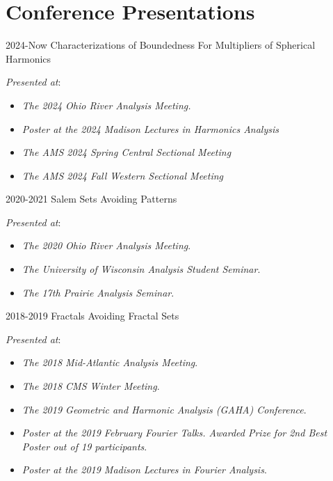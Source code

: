 \documentclass[a4paper]{cv-friggeri}
\begin{document}
\section{Conference Presentations}

\begin{entrylist}

\entry
{2024-Now}
{Characterizations of Boundedness For Multipliers of Spherical Harmonics}
{}
{\emph{Presented at}:
%
\begin{itemize}
	\item \emph{The 2024 Ohio River Analysis Meeting.}
	\item \emph{Poster at the 2024 Madison Lectures in Harmonics Analysis}
	\item \emph{The AMS 2024 Spring Central Sectional Meeting}%
	\item \emph{The AMS 2024 Fall Western Sectional Meeting}%
\end{itemize}
%
}

\entry
{2020-2021}
{Salem Sets Avoiding Patterns}
{}
{\emph{Presented at}:
%
\begin{itemize}
	\item \emph{The 2020 Ohio River Analysis Meeting}.
	\item \emph{The University of Wisconsin Analysis Student Seminar}.
	\item \emph{The 17th Prairie Analysis Seminar}.
\end{itemize}
%
}

\entry
{2018-2019}
{Fractals Avoiding Fractal Sets}
{}
{\emph{Presented at}:
%
\begin{itemize}
	\item \emph{The 2018 Mid-Atlantic Analysis Meeting}.
	\item \emph{The 2018 CMS Winter Meeting}.
	\item \emph{The 2019 Geometric and Harmonic Analysis (GAHA) Conference}.
	\item \emph{Poster at the 2019 February Fourier Talks. Awarded Prize for 2nd Best Poster out of 19 participants}.
	\item \emph{Poster at the 2019 Madison Lectures in Fourier Analysis}.
\end{itemize}
%
}

\end{entrylist}
\end{document}
